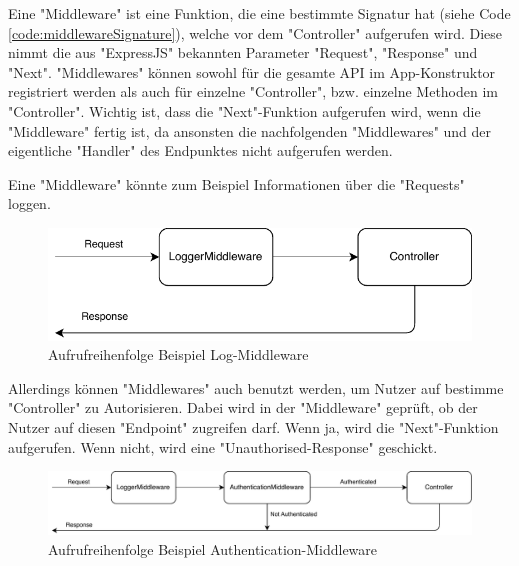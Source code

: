 \label{sec:middleware}

Eine "Middleware" ist eine Funktion, die eine bestimmte Signatur hat (siehe Code \ref{code:middlewareSignature}), welche vor dem "Controller" aufgerufen wird. 
Diese nimmt die aus "ExpressJS" bekannten Parameter "Request", "Response" und "Next". 
"Middlewares" können sowohl für die gesamte API im App-Konstruktor registriert werden als auch für einzelne "Controller", bzw. einzelne Methoden im "Controller". 
Wichtig ist, dass die "Next"-Funktion aufgerufen wird, wenn die "Middleware" fertig ist, da ansonsten die nachfolgenden "Middlewares" und der eigentliche "Handler" des Endpunktes nicht aufgerufen werden.


Eine "Middleware" könnte zum Beispiel Informationen über die "Requests" loggen. 

\begin{figure}[H]
    \centering
    \includegraphics{media/APITemplate/LogMiddleware.svg.pdf}
    \caption{Aufrufreihenfolge Beispiel Log-Middleware} 
\end{figure}

Allerdings können "Middlewares" auch benutzt werden, um Nutzer auf bestimme "Controller" zu Autorisieren. Dabei wird in der "Middleware" geprüft, ob der Nutzer auf diesen "Endpoint" zugreifen darf. Wenn ja, wird die "Next"-Funktion aufgerufen. Wenn nicht, wird eine "Unauthorised-Response" geschickt.

\begin{figure}[H]
    \centering
    \includegraphics[width=15cm]{media/APITemplate/AuthMiddleware.svg.pdf}
    \caption{Aufrufreihenfolge Beispiel Authentication-Middleware} 
\end{figure}